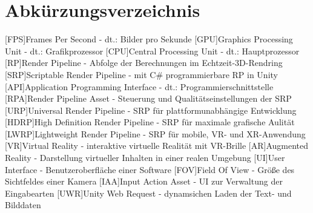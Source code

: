 \chapter{Abkürzungsverzeichnis}
%
\begin{acronym}
	[FPS]{Frames Per Second - dt.: Bilder pro Sekunde}
	[GPU]{Graphics Processing Unit - dt.: Grafikprozessor}
	[CPU]{Central Processing Unit - dt.: Hauptprozessor}
	[RP]{Render Pipeline - Abfolge der Berechnungen im Echtzeit-3D-Rendring}
	[SRP]{Scriptable Render Pipeline - mit C\# programmierbare RP in Unity}
	[API]{Application Programming Interface - dt.: Programmierschnittstelle}
	[RPA]{Render Pipeline Asset - Steuerung und Qualitätseinstellungen der SRP}
	[URP]{Universal Render Pipeline - SRP für plattformunabhängige Entwicklung}
	[HDRP]{High Definition Render Pipeline - SRP für maximale grafische Aulität}
	[LWRP]{Lightweight Render Pipeline - SRP für mobile, VR- und XR-Anwendung}
	[VR]{Virtual Reality - interaktive virtuelle Realität mit VR-Brille}
	[AR]{Augmented Reality - Darstellung virtueller Inhalten in einer realen Umgebung}
	[UI]{User Interface - Benutzeroberfläche einer Software}
	[FOV]{Field Of View - Größe des Sichtfeldes einer Kamera}
	[IAA]{Input Action Asset - UI zur Verwaltung der Eingabearten}
	[UWR]{Unity Web Request - dynamsichen Laden der Text- und Bilddaten}
\end{acronym}
%